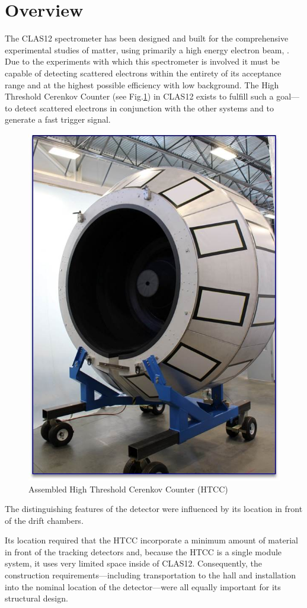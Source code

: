 \section{Overview}

The CLAS12 spectrometer has been designed and built for the comprehensive experimental studies of matter, using primarily a high energy electron beam, \cite{youris}. Due to the experiments with which this spectrometer is involved it must be capable of detecting scattered electrons within the entirety of its acceptance range and at the highest possible efficiency with low background. The High Threshold Cerenkov Counter (see Fig.\ref{fig:setup}) in CLAS12 exists to fulfill such a goal---to detect scattered electrons in conjunction with the other systems and to generate a fast trigger signal. 

\begin{figure}[h]
    \centering
    \includegraphics[width=0.75\linewidth]{images/Picture1.jpg}
    \caption{Assembled High Threshold Cerenkov Counter (HTCC)}
    \label{fig:setup}
\end{figure}
The distinguishing features of the detector were influenced by its location in front of the drift chambers. 

Its location required that the HTCC incorporate a minimum amount of material in front of the tracking detectors and, because the HTCC is a single module system, it uses very limited space inside of CLAS12. Consequently, the construction requirements---including transportation to the hall and installation into the nominal location of the detector---were all equally important for its structural design. 






